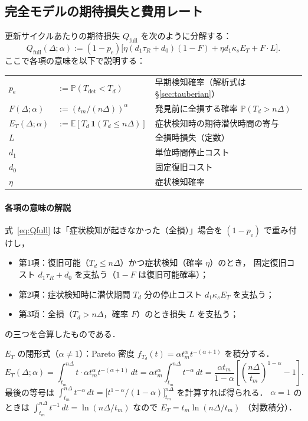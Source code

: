 \documentclass[12pt,a4paper]{article}
\theoremstyle{plain}
\theoremstyle{definition}
\theoremstyle{remark}
\newcommand{\E}{\mathbb{E}}
\newcommand{\Prob}{\mathbb{P}}
\newcommand{\pe}{p_{\mathrm{e}}}
\newcommand{\Qf}{Q_{\mathrm{full}}}
\newcommand{\Tdet}{T_{\mathrm{det}}}
\begin{document}
\subsection{完全モデルの期待損失と費用レート}

更新サイクルあたりの期待損失 $\Qf$ を次のように分解する：
\begin{equation}\label{eq:Qfull}
\Qf(\Delta;\alpha)
:=(1-\pe)\bigl[\eta(d_1\tau_R+d_0)(1-F)+\eta d_1\kappa_s E_T+F\cdot L\bigr].
\end{equation}
ここで各項の意味を以下で説明する：

\medskip
\begin{tabular}{@{}ll p{88mm}@{}}
$\pe$ & $:=\Prob(\Tdet<T_d)$ & 早期検知確率（解析式は \S\ref{sec:tauberian}）\\
$F(\Delta;\alpha)$ & $:=(t_m/(n\Delta))^\alpha$ & 発見前に全損する確率 $\Prob(T_d>n\Delta)$ \\
$E_T(\Delta;\alpha)$ & $:=\E[T_d\,\mathbf{1}(T_d\le n\Delta)]$ & 症状検知時の期待潜伏時間の寄与 \\
$L$ & & 全損時損失（定数）\\
$d_1$ & & 単位時間停止コスト\\
$d_0$ & & 固定復旧コスト\\
$\eta$ & & 症状検知確率\\
\end{tabular}
\medskip

\paragraph{各項の意味の解説}
式~\eqref{eq:Qfull} は「症状検知が起きなかった（全損）」場合を $(1-\pe)$ で重み付けし，
\begin{itemize}[leftmargin=2em]
\item 第1項：復旧可能（$T_d\le n\Delta$）かつ症状検知（確率 $\eta$）のとき，
  固定復旧コスト $d_1\tau_R+d_0$ を支払う（$1-F$ は復旧可能確率）；
\item 第2項：症状検知時に潜伏期間 $T_d$ 分の停止コスト $d_1\kappa_s E_T$ を支払う；
\item 第3項：全損（$T_d>n\Delta$，確率 $F$）のとき損失 $L$ を支払う；
\end{itemize}
の三つを合算したものである．

\medskip
$E_T$ の閉形式（$\alpha\ne1$）：Pareto 密度 $f_{T_d}(t)=\alpha t_m^\alpha t^{-(\alpha+1)}$ を積分する．
\begin{equation}\label{eq:ET}
E_T(\Delta;\alpha)
=\int_{t_m}^{n\Delta} t\cdot\alpha t_m^\alpha t^{-(\alpha+1)}\,dt
=\alpha t_m^\alpha\int_{t_m}^{n\Delta}t^{-\alpha}\,dt
=\frac{\alpha t_m}{1-\alpha}\!\left[\!\left(\frac{n\Delta}{t_m}\right)^{\!1-\alpha}\!-1\right].
\end{equation}
最後の等号は $\int_{t_m}^{n\Delta}t^{-\alpha}\,dt=\bigl[t^{1-\alpha}/(1-\alpha)\bigr]_{t_m}^{n\Delta}$
を計算すれば得られる．
$\alpha=1$ のときは $\int_{t_m}^{n\Delta}t^{-1}\,dt=\ln(n\Delta/t_m)$ なので
$E_T=t_m\ln(n\Delta/t_m)$ （対数積分）．
\end{document}
